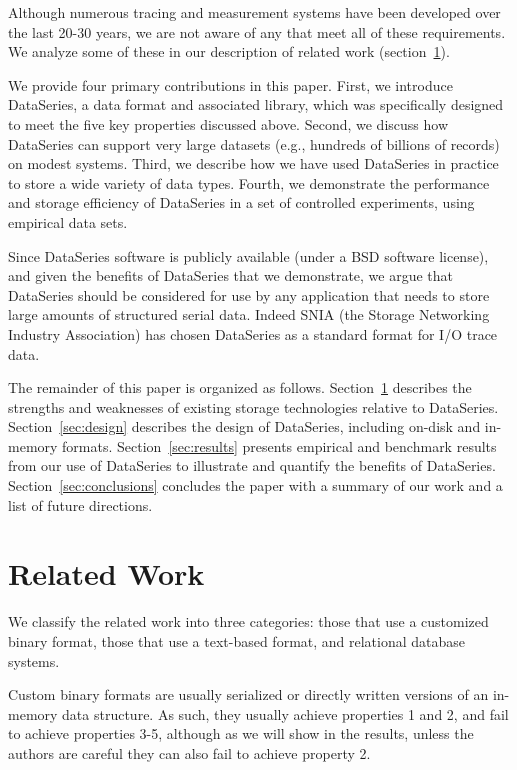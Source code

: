 \documentclass{acm_proc_article-sp}
\begin{document}
Although numerous tracing and measurement systems have been developed
over the last 20-30 years, we are not aware of any that meet all of
these requirements. We analyze some of these in our description of
related work (section~\ref{sec:related}).

We provide four primary contributions in this paper.  First, we
introduce DataSeries, a data format and associated library, which was
specifically designed to meet the five key properties discussed above.
Second, we discuss how DataSeries can support very large datasets
(e.g., hundreds of billions of records) on modest systems.  Third, we
describe how we have used DataSeries in practice to store a wide
variety of data types.  Fourth, we demonstrate the performance and
storage efficiency of DataSeries in a set of controlled experiments,
using empirical data sets. 

Since DataSeries software is publicly available (under a BSD software
license), and given the benefits of DataSeries that we demonstrate, we
argue that DataSeries should be considered for use by any application
that needs to store large amounts of structured serial data. Indeed
SNIA (the Storage Networking Industry Association)
has chosen DataSeries as a standard format for I/O trace data.

The remainder of this paper is organized as follows.
Section~\ref{sec:related} describes the strengths and weaknesses of
existing storage technologies relative to DataSeries.
Section~\ref{sec:design} describes the design of DataSeries, including
on-disk and in-memory formats.
Section~\ref{sec:results} presents empirical and benchmark results
from our use of DataSeries to illustrate and quantify the benefits of
DataSeries. Section~\ref{sec:conclusions} concludes the
paper with a summary of our work and a list of future directions.

\section{Related Work}\label{sec:related}

We classify the related work into three categories:
those that use a customized binary format, those that use a
text-based format, and relational database systems. 

Custom binary formats are usually serialized or directly written
versions of an in-memory data structure.  As such, they usually
achieve properties 1 and 2, and fail to achieve properties 3-5,
although as we will show in the results, unless the authors are
careful they can also fail to achieve property 2.
\end{document}
